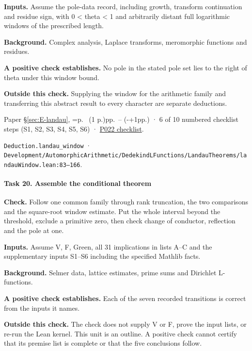 \textbf{Inputs.} Assume the pole-data record, including growth, transform continuation and residue sign, with 0 < theta < 1 and arbitrarily distant full logarithmic windows of the prescribed length.

\textbf{Background.} Complex analysis, Laplace transforms, meromorphic functions and residues.

\textbf{A positive check establishes.} No pole in the stated pole set lies to the right of theta under this window bound.

\textbf{Outside this check.} Supplying the window for the arithmetic family and transferring this abstract result to every character are separate deductions.

Paper \S\ref{sec:E-landau}, \ifnum{}=\relax p.\ \pageref{sec:E-landau} (1 p.)\else pp.\ \pageref{sec:E-landau}--\pageref{rem:E-landau-compare} (\number\numexpr{}-+1\relax pp.)\fi{} · 6 of 10 numbered checklist steps (S1, S2, S3, S4, S5, S6) · \href{https://github.com/GunheeC/rh-lean-verification-atlas/blob/v0.1.0/units/P022.check.md}{P022 checklist}.

\nolinkurl{Deduction.landau_window} · \nolinkurl{Development/AutomorphicArithmetic/DedekindLFunctions/LandauTheorems/landauWindow.lean:83–166}.

\paragraph{Task 20. Assemble the conditional theorem}\label{v7:task-20}

\textbf{Check.} Follow one common family through rank truncation, the two comparisons and the square-root window estimate. Put the whole interval beyond the threshold, exclude a primitive zero, then check change of conductor, reflection and the pole at one.

\textbf{Inputs.} Assume V, F, Green, all 31 implications in lists A–C and the supplementary inputs S1–S6 including the specified Mathlib facts.

\textbf{Background.} Selmer data, lattice estimates, prime sums and Dirichlet L-functions.

\textbf{A positive check establishes.} Each of the seven recorded transitions is correct from the inputs it names.

\textbf{Outside this check.} The check does not supply V or F, prove the input lists, or re-run the Lean kernel. This unit is an outline. A positive check cannot certify that its premise list is complete or that the five conclusions follow.

